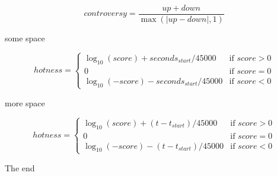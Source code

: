 \documentclass[11pt]{amsart}
\begin{document}


$$ 
controversy = \frac{up + down} { \max( | up - down | , 1)}
$$ 

some space


\begin{equation*} 
hotness = 
\begin{cases} 
\log_{10}(score) + seconds_{start} / 45000   & \text{if $score > 0$}\\ 
0                                                                             & \text{if $score = 0$}\\ 
\log_{10}(-score) - seconds_{start} / 45000   & \text{if $score < 0$} 
\end{cases} 
\end{equation*} 

more space 

\begin{equation*} 
hotness = 
\begin{cases} 
\log_{10}(score) + (t-t_{start}) / 45000   & \text{if $score > 0$}\\ 
0                                                                             & \text{if $score = 0$}\\ 
\log_{10}(-score) -  (t-t_{start})  / 45000   & \text{if $score < 0$} 
\end{cases} 
\end{equation*} 

The end
\end{document}

